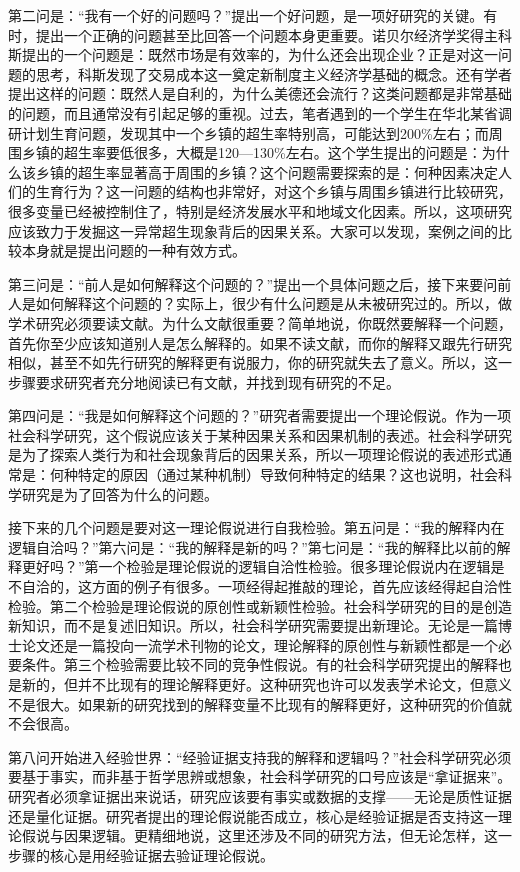 第二问是：“我有一个好的问题吗？”提出一个好问题，是一项好研究的关键。有时，提出一个正确的问题甚至比回答一个问题本身更重要。诺贝尔经济学奖得主科斯提出的一个问题是：既然市场是有效率的，为什么还会出现企业？正是对这一问题的思考，科斯发现了交易成本这一奠定新制度主义经济学基础的概念。还有学者提出这样的问题：既然人是自利的，为什么美德还会流行？这类问题都是非常基础的问题，而且通常没有引起足够的重视。过去，笔者遇到的一个学生在华北某省调研计划生育问题，发现其中一个乡镇的超生率特别高，可能达到200\%左右；而周围乡镇的超生率要低很多，大概是120—130\%左右。这个学生提出的问题是：为什么该乡镇的超生率显著高于周围的乡镇？这个问题需要探索的是：何种因素决定人们的生育行为？这一问题的结构也非常好，对这个乡镇与周围乡镇进行比较研究，很多变量已经被控制住了，特别是经济发展水平和地域文化因素。所以，这项研究应该致力于发掘这一异常超生现象背后的因果关系。大家可以发现，案例之间的比较本身就是提出问题的一种有效方式。

第三问是：“前人是如何解释这个问题的？”提出一个具体问题之后，接下来要问前人是如何解释这个问题的？实际上，很少有什么问题是从未被研究过的。所以，做学术研究必须要读文献。为什么文献很重要？简单地说，你既然要解释一个问题，首先你至少应该知道别人是怎么解释的。如果不读文献，而你的解释又跟先行研究相似，甚至不如先行研究的解释更有说服力，你的研究就失去了意义。所以，这一步骤要求研究者充分地阅读已有文献，并找到现有研究的不足。

第四问是：“我是如何解释这个问题的？”研究者需要提出一个理论假说。作为一项社会科学研究，这个假说应该关于某种因果关系和因果机制的表述。社会科学研究是为了探索人类行为和社会现象背后的因果关系，所以一项理论假说的表述形式通常是：何种特定的原因（通过某种机制）导致何种特定的结果？这也说明，社会科学研究是为了回答为什么的问题。

接下来的几个问题是要对这一理论假说进行自我检验。第五问是：“我的解释内在逻辑自洽吗？”第六问是：“我的解释是新的吗？”第七问是：“我的解释比以前的解释更好吗？”第一个检验是理论假说的逻辑自洽性检验。很多理论假说内在逻辑是不自洽的，这方面的例子有很多。一项经得起推敲的理论，首先应该经得起自洽性检验。第二个检验是理论假说的原创性或新颖性检验。社会科学研究的目的是创造新知识，而不是复述旧知识。所以，社会科学研究需要提出新理论。无论是一篇博士论文还是一篇投向一流学术刊物的论文，理论解释的原创性与新颖性都是一个必要条件。第三个检验需要比较不同的竞争性假说。有的社会科学研究提出的解释也是新的，但并不比现有的理论解释更好。这种研究也许可以发表学术论文，但意义不是很大。如果新的研究找到的解释变量不比现有的解释更好，这种研究的价值就不会很高。

第八问开始进入经验世界：“经验证据支持我的解释和逻辑吗？”社会科学研究必须要基于事实，而非基于哲学思辨或想象，社会科学研究的口号应该是“拿证据来”。研究者必须拿证据出来说话，研究应该要有事实或数据的支撑——无论是质性证据还是量化证据。研究者提出的理论假说能否成立，核心是经验证据是否支持这一理论假说与因果逻辑。更精细地说，这里还涉及不同的研究方法，但无论怎样，这一步骤的核心是用经验证据去验证理论假说。

